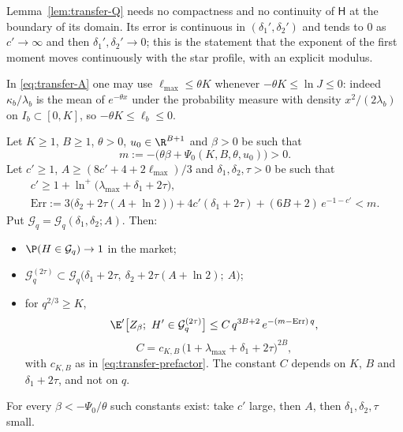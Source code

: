 Lemma~\ref{lem:transfer-Q} needs no compactness and no continuity of $\mathsf H$ at the
boundary of its domain. Its error is continuous in $(\delta_1',\delta_2')$ and tends to $0$ as
$c'\to\infty$ and then $\delta_1',\delta_2'\to0$; this is the statement that the exponent of
the first moment moves continuously with the star profile, with an explicit modulus.

In \eqref{eq:transfer-A} one may use $\ell_{\max}\le\theta K$ whenever $-\theta K\le\ln J\le0$:
indeed $\kappa_b/\lambda_b$ is the mean of $e^{-\theta x}$ under the probability measure with
density $x^2/(2\lambda_b)$ on $I_b\subset[0,K]$, so $-\theta K\le\ell_b\le0$.

\begin{proposition}\label{prop:transfer-interface}
Let $K\ge1$, $B\ge1$, $\theta>0$, $u_0\in\R^{B+1}$ and $\beta>0$ be such that
\[
m:=-\bigl(\theta\beta+\Psi_0(K,B,\theta,u_0)\bigr)>0 .
\]
Let $c'\ge1$, $A\ge(8c'+4+2\ell_{\max})/3$ and $\delta_1,\delta_2,\tau>0$ be such that
\begin{equation}\label{eq:transfer-Err}
\begin{gathered}
c'\ge1+\ln^+\bigl(\lambda_{\max}+\delta_1+2\tau\bigr),\\
\mathrm{Err}:=3\bigl(\delta_2+2\tau(A+\ln2)\bigr)+4c'(\delta_1+2\tau)+(6B+2)\,e^{-1-c'}<m .
\end{gathered}
\end{equation}
Put $\mathcal G_q=\mathcal G_q(\delta_1,\delta_2;A)$. Then:
\begin{itemize}
\item[(i)] $\P(H\in\mathcal G_q)\to1$ in the market;
\item[(ii)] $\mathcal G_q^{(2\tau)}\subset\mathcal G_q\bigl(\delta_1+2\tau,\ \delta_2+2\tau(A+\ln2);\ A\bigr)$;
\item[(iii)] for $q^{2/3}\ge K$,
\[
\E'\bigl[Z_\beta;\ H'\in\mathcal G_q^{(2\tau)}\bigr]\le C\,q^{3B+2}\,e^{-(m-\mathrm{Err})\,q},
\]
\[
C=c_{K,B}\,\bigl(1+\lambda_{\max}+\delta_1+2\tau\bigr)^{2B},
\]
with $c_{K,B}$ as in \eqref{eq:transfer-prefactor}. The constant $C$ depends on $K$, $B$ and
$\delta_1+2\tau$, and not on $q$.
\end{itemize}
For every $\beta<-\Psi_0/\theta$ such constants exist: take $c'$ large, then $A$, then
$\delta_1,\delta_2,\tau$ small.
\end{proposition}

